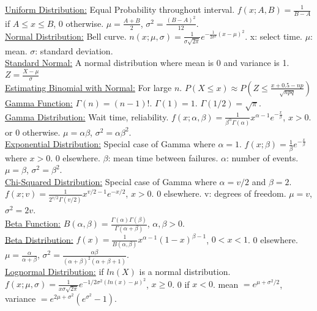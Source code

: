\documentclass[9pt]{article}
\begin{document}
    \begin{multicols}{2}
        \noindent\uline{Uniform Distribution:} Equal Probability throughout interval. $f(x; A,B)=\frac{1}{B-A}$ if $A\leq x \leq B$,
        0 otherwise. $\mu=\frac{A+B}{2}$, $\sigma^2=\frac{(B-A)^2}{12}$.\\
        \uline{Normal Distribution:} Bell curve. $n(x;\mu,\sigma)=\frac{1}{\sigma\sqrt{2\pi}}e^{-\frac{1}{2\sigma^2}(x-\mu)^2}$.
        x: select time. $\mu$: mean. $\sigma$: standard deviation.\\
        \uline{Standard Normal:} A normal distribution where mean is 0 and variance is 1.
        $Z=\frac{X-\mu}{\sigma}$\\
        \uline{Estimating Binomial with Normal:} For large $n$. $P(X\leq x) \approx P(Z\leq \frac{x+0.5-np}{\sqrt{npq}})$\\
        \uline{Gamma Function:} $\Gamma(n) = (n-1)!$. $\Gamma(1)=1$. $\Gamma(1/2)=\sqrt{\pi}$.\\
        \uline{Gamma Distribution:} Wait time, reliability. $f(x;\alpha,\beta)=\frac{1}{\beta^{\alpha}\Gamma(\alpha)}x^{\alpha-1}e^{-\frac{x}{\beta}}$, $x>0$.
        or 0 otherwise. $\mu=\alpha\beta$, $\sigma^2=\alpha\beta^2$.\\
        \uline{Exponential Distribution:} Special case of Gamma where $\alpha=1$. $f(x;\beta)=\frac{1}{\beta}e^{-\frac{x}{\beta}}$ where $x>0$. 0 elsewhere. $\beta$: 
        mean time between failures. $\alpha$: number of events. $\mu=\beta$, $\sigma^2=\beta^2$.\\
        \uline{Chi-Squared Distribution:} Special case of Gamma where $\alpha=v/2$ and $\beta=2$.
        $f(x;v)=\frac{1}{2^{v/2}\Gamma(v/2)}x^{v/2-1}e^{-x/2}$, $x>0$. 0 elsewhere. v: degrees of freedom. $\mu=v$,
        $\sigma^2=2v$.\\
        \uline{Beta Function:} $B(\alpha,\beta)=\frac{\Gamma(\alpha)\Gamma(\beta)}{\Gamma(\alpha+\beta)}$, $\alpha,\beta >0$.\\
        \uline{Beta Distribution:} $f(x)=\frac{1}{B(\alpha,\beta)}x^{\alpha-1}(1-x)^{\beta-1}$, $0<x<1$. 0 elsewhere.
        $\mu=\frac{\alpha}{\alpha+\beta}$, $\sigma^2=\frac{\alpha\beta}{(\alpha+\beta)^2(\alpha+\beta+1)}$.\\
        \uline{Lognormal Distribution:} if $ln(X)$ is a normal distribution. $f(x;\mu,\sigma)=\frac{1}{x\sigma\sqrt{2\pi}}e^{-1/2\sigma^2(ln(x)-\mu)^2}$, $x\geq 0$.
        0 if $x<0$. mean $ =e^{\mu+\sigma^2/2}$, variance $=e^{2\mu+\sigma^2}(e^{\sigma^2}-1)$.    \end{multicols}
\end{document}
